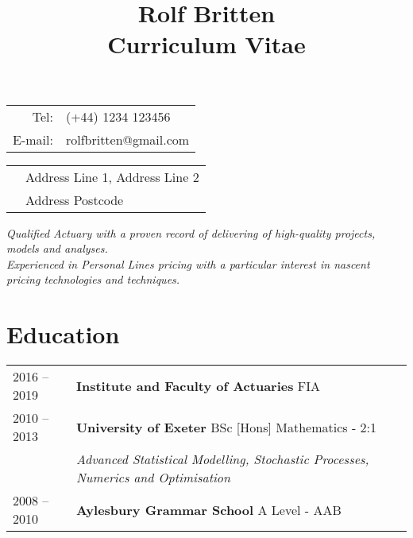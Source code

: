 \documentclass[11pt]{article}
\title{\bfseries \Huge Rolf Britten \\ \Large Curriculum Vitae}
\date{}
\begin{document}
\vspace{-20mm}
\maketitle
\vspace{-20mm}
\begin{minipage}[ht]{0.48\textwidth}
\begin{tabular}{r l}
Tel: & (+44) 1234 123456\\
E-mail: & rolfbritten@gmail.com\\
\end{tabular}
\end{minipage}
\begin{minipage}[ht]{0.48\textwidth}
\begin{tabular}{l l}
& Address Line 1, Address Line 2\\
& Address Postcode\
\end{tabular}
\end{minipage}

\begin{center} \emph{ Qualified Actuary with a proven record of delivering of high-quality projects, models and analyses.\\Experienced in Personal Lines pricing with a particular interest in nascent pricing technologies and techniques.} \end{center}

\section*{Education}
\begin{tabular}{l | l l}
2016 -- 2019 & \textbf{Institute and Faculty of Actuaries} FIA \\
2010 -- 2013 & \textbf{University of Exeter} BSc [Hons] Mathematics - 2:1\\
& \hspace{4mm} \textit{Advanced Statistical Modelling, Stochastic Processes, Numerics and Optimisation }\\
2008 -- 2010 & \textbf{Aylesbury Grammar School} A Level - AAB \\
\end{tabular}
\end{document}

